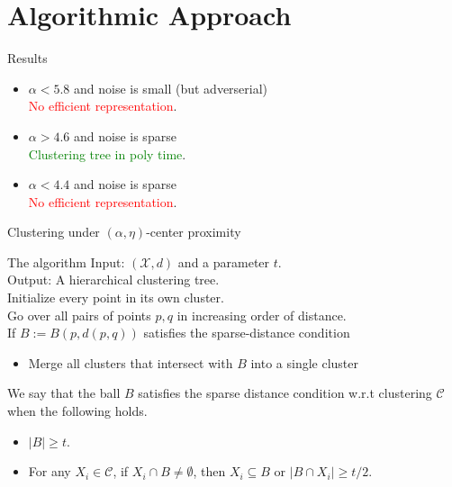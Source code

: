 \documentclass{beamer}
\newcommand{\mc}{\mathcal}
\begin{document}
\section{Algorithmic Approach}

\begin{frame}{Results}
  \begin{itemize}
  	\item $\alpha < 5.8$ and noise is small (but adverserial)\\ \textcolor{red}{No efficient representation}. 
  	\pause
  	\item $\alpha > 4.6$ and noise is sparse\\ 
  	\textcolor{green}{Clustering tree in poly time}.
  	\pause
  	\item $\alpha < 4.4$ and noise is sparse\\ 
  	\textcolor{red}{No efficient representation}. 
  \end{itemize}
\end{frame}

\begin{frame}{Clustering under $(\alpha, \eta)$-center proximity}
	\begin{block}{The algorithm}
	  Input: $(\mc X, d)$ and a parameter $t$.\\
	  Output: A hierarchical clustering tree.\\
	  \vspace{0.1in}Initialize every point in its own cluster.\\
	  Go over all pairs of points $p, q$ in increasing order of distance.\\
	  If $B := B(p, d(p, q))$ satisfies the sparse-distance condition
	  \begin{itemize}
	  	\item Merge all clusters that intersect with $B$ into a single cluster
	  \end{itemize}
    \end{block}
        
    \vspace{0.2in}We say that the ball $B$ satisfies the sparse distance condition w.r.t clustering $\mc C$ when the following holds.
	\begin{itemize}
	  \item $|B| \ge t$.
	  \item For any $X_i \in \mc C$, if $X_i \cap B \neq \emptyset$, then $X_i \subseteq B$ or $|B \cap X_i| \ge t/2$.
	\end{itemize}
\end{frame}
\end{document}
